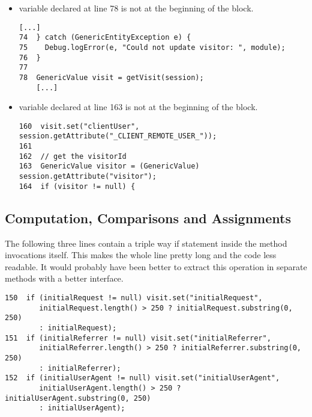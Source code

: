 \begin{itemize}
    \item
         variable declared at line 78 is not at the beginning of the block.\\
        \begin{lstlisting}[basicstyle=\small\ttfamily,columns=fullflexible]
    [...]
74  } catch (GenericEntityException e) {
75    Debug.logError(e, "Could not update visitor: ", module);
76  }
77
78  GenericValue visit = getVisit(session);
    [...]
        \end{lstlisting}
    \item
         variable declared at line 163 is not at the beginning of the block.\\
        \begin{lstlisting}[basicstyle=\small\ttfamily,columns=fullflexible]
160  visit.set("clientUser", session.getAttribute("_CLIENT_REMOTE_USER_"));
161  
162  // get the visitorId
163  GenericValue visitor = (GenericValue) session.getAttribute("visitor");
164  if (visitor != null) {
        \end{lstlisting}
\end{itemize}

\subsection{Computation, Comparisons and Assignments}

    The following three lines contain a triple way if statement inside the method
    invocations itself. This makes the whole line pretty long and the code less readable.
    It would probably have been better to extract this operation in separate methods
    with a better interface.

    \begin{lstlisting}[basicstyle=\small\ttfamily,columns=fullflexible]
150  if (initialRequest != null) visit.set("initialRequest",
        initialRequest.length() > 250 ? initialRequest.substring(0, 250)
        : initialRequest);
151  if (initialReferrer != null) visit.set("initialReferrer",
        initialReferrer.length() > 250 ? initialReferrer.substring(0, 250)
        : initialReferrer);
152  if (initialUserAgent != null) visit.set("initialUserAgent",
        initialUserAgent.length() > 250 ? initialUserAgent.substring(0, 250)
        : initialUserAgent);
    \end{lstlisting}

